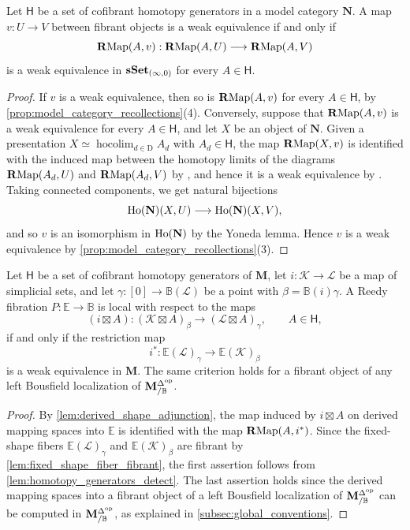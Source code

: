 \documentclass[10pt,reqno]{amsart}
\begin{document}
\begin{lemma}
\label{lem:homotopy_generators_detect}
Let $\mathsf H$ be a set of cofibrant homotopy generators in a
model category $\mathbf N$. A map $v:U\to V$ between fibrant
objects is a weak equivalence if and only if
\[
\mathbf{R}\mathrm{Map}(A,v):\mathbf{R}\mathrm{Map}(A,U)\longrightarrow\mathbf{R}\mathrm{Map}(A,V)
\]
is a weak equivalence in $\mathbf{sSet}_{(\infty,0)}$ for every
$A\in\mathsf H$.
\end{lemma}
\begin{proof}
If $v$ is a weak equivalence, then so is $\mathbf{R}\mathrm{Map}(A,v)$ for every
$A\in\mathsf H$, by \cref{prop:model_category_recollections}(4).
Conversely, suppose that $\mathbf{R}\mathrm{Map}(A,v)$ is a weak equivalence for
every $A\in\mathsf H$, and let $X$ be an object of $\mathbf N$.
Given a presentation
$X\simeq\operatorname{hocolim}_{d\in\mathrm D}A_d$ with
$A_d\in\mathsf H$, the map $\mathbf{R}\mathrm{Map}(X,v)$ is identified with the
induced map between the homotopy limits of the diagrams
$\mathbf{R}\mathrm{Map}(A_d,U)$ and $\mathbf{R}\mathrm{Map}(A_d,V)$ by
\cite[Theorem~19.4.4\textup{(1)}]{hirschhorn2003model}, and hence it
is a weak equivalence by
\cite[Theorem~19.4.2\textup{(2)}]{hirschhorn2003model}. Taking
connected components, we get natural bijections
\[
\operatorname{Ho}(\mathbf N)(X,U)\longrightarrow\operatorname{Ho}(\mathbf N)(X,V),
\]
and so $v$ is an isomorphism in $\operatorname{Ho}(\mathbf N)$ by the Yoneda
lemma. Hence $v$ is a weak equivalence by
\cref{prop:model_category_recollections}(3).
\end{proof}

\begin{lemma}
\label{lem:shape_locality}
Let $\mathsf H$ be a set of cofibrant homotopy generators of
$\mathbf M$, let $i:\mathcal K\to\mathcal L$ be a map of
simplicial sets, and let $\gamma:[0]\to\mathbb B(\mathcal L)$ be a
point with $\beta=\mathbb B(i)\gamma$. A Reedy fibration
$P:\mathbb E\to\mathbb B$ is local with respect to the maps
\[
(i\boxtimes A):
(\mathcal K\boxtimes A)_\beta
\longrightarrow(\mathcal L\boxtimes A)_\gamma,
\qquad A\in\mathsf H,
\]
if and only if the restriction map
\[
i^*:\mathbb E(\mathcal L)_\gamma
\longrightarrow\mathbb E(\mathcal K)_\beta
\]
is a weak equivalence in $\mathbf M$. The same criterion holds for
a fibrant object of any left Bousfield localization of
$\mathbf M^{\Delta^{\mathrm{op}}}_{/\mathbb B}$.
\end{lemma}
\begin{proof}
By \cref{lem:derived_shape_adjunction}, the map induced by
$i\boxtimes A$ on derived mapping spaces into $\mathbb E$ is
identified with the map $\mathbf{R}\mathrm{Map}(A,i^*)$. Since the fixed-shape fibers
$\mathbb E(\mathcal L)_\gamma$ and $\mathbb E(\mathcal K)_\beta$
are fibrant by \cref{lem:fixed_shape_fiber_fibrant}, the first
assertion follows from \cref{lem:homotopy_generators_detect}. The last
assertion holds since the derived mapping spaces into a fibrant object
of a left Bousfield localization of $\mathbf M^{\Delta^{\mathrm{op}}}_{/\mathbb B}$ can be computed
in $\mathbf M^{\Delta^{\mathrm{op}}}_{/\mathbb B}$, as explained in
\cref{subsec:global_conventions}.
\end{proof}
\end{document}
